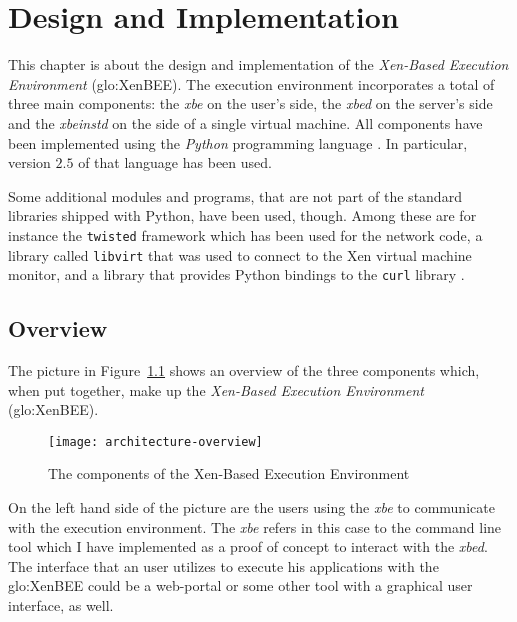 
\chapter{Design and Implementation}
\label{cha:design}

This chapter is about the design and implementation of the \emph{Xen-Based
  Execution  Environment} (\gls{glo:XenBEE}).   The  execution environment
incorporates  a total  of three  main  components: the  \emph{xbe} on  the
user's side, the \emph{xbed} on  the server's side and the \emph{xbeinstd}
on  the  side of  a  single virtual  machine.   All  components have  been
implemented     using    the     \emph{Python}     programming    language
\cite{python-language}. In particular, version  $2.5$ of that language has
been used.

Some additional  modules and programs, that  are not part  of the standard
libraries shipped with Python, have been used, though. Among these are for
instance  the \texttt{twisted}  framework \cite{twisted-python}  which has
been  used  for  the  network  code,  a  library  called  \texttt{libvirt}
\cite{libvirt}  that  was used  to  connect  to  the Xen  virtual  machine
monitor, and a library that  provides Python bindings to the \texttt{curl}
library \cite{pycurl}.


\section{Overview}
\label{sec:design:overview}

The picture in Figure~\ref{fig:architecture-overview} shows an overview of
the three components which, when put together, make up the \emph{Xen-Based
  Execution Environment} (\gls{glo:XenBEE}).

\begin{figure}[ht]
  \centering
  \texttt{[image: architecture-overview]}
  \caption[Overview of the  \gls{glo:XenBEE} components]{The components of
    the Xen-Based Execution Environment}
  \label{fig:architecture-overview}
\end{figure}

On the left hand side of the picture are the users using the \emph{xbe} to
communicate with the execution  environment. The \emph{xbe} refers in this
case  to the command  line tool  which I  have implemented  as a  proof of
concept  to interact  with the  \emph{xbed}.  The  interface that  an user
utilizes to execute his applications  with the \gls{glo:XenBEE} could be a
web-portal or some other tool with a graphical user interface, as well.


